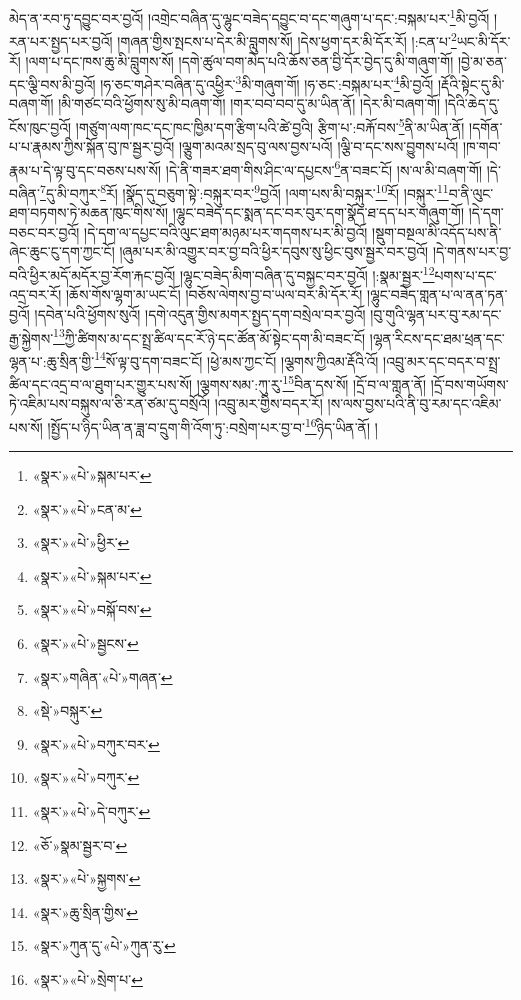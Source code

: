 མེད་ན་རབ་ཏུ་དབྱུང་བར་བྱའོ། །འགྲེང་བཞིན་དུ་ལྷུང་བཟེད་དབྱུང་བ་དང་གཞུག་པ་དང་:བསྐམ་པར་\footnote{«སྣར་»«པེ་»སྐམ་པར་}མི་བྱའོ། །རན་པར་སྤྱད་པར་བྱའོ། །གཞན་གྱིས་སྤངས་པ་དེར་མི་བླུགས་སོ། །དེས་ཕྱག་དར་མི་དོར་རོ། །:ངན་པ་\footnote{«སྣར་»«པེ་»ངན་མ་}ཡང་མི་དོར་རོ། །ལག་པ་དང་ཁས་ཆུ་མི་བླུགས་སོ། །དགེ་ཚུལ་བག་མེད་པའི་ཆོས་ཅན་བྱི་དོར་བྱེད་དུ་མི་གཞུག་གོ། །བྱེ་མ་ཅན་དང་ལྕི་བས་མི་བྱའོ། །ཧ་ཅང་གཤེར་བཞིན་དུ་འཕྱིར་\footnote{«སྣར་»«པེ་»ཕྱིར་}མི་གཞུག་གོ། །ཧ་ཅང་:བསྐམ་པར་\footnote{«སྣར་»«པེ་»སྐམ་པར་}མི་བྱའོ། །རྡོའི་སྟེང་དུ་མི་བཞག་གོ། །མི་གཙང་བའི་ཕྱོགས་སུ་མི་བཞག་གོ། །གར་བབ་བབ་དུ་མ་ཡིན་ནོ། །དེར་མི་བཞག་གོ། །དེའི་ཆེད་དུ་ངོས་ཁུང་བྱའོ། །གཙུག་ལག་ཁང་དང་ཁང་ཁྱིམ་དག་རྩིག་པའི་ཚེ་བྱའི། རྩིག་པ་:བརྐོ་བས་\footnote{«སྣར་»«པེ་»བསྐོ་བས་}ནི་མ་ཡིན་ནོ། །དགོན་པ་པ་རྣམས་ཀྱིས་སྐོན་བུ་ཁ་སྦྱར་བྱའོ། །ལྕུག་མའམ་སྲད་བུ་ལས་བྱས་པའོ། །ལྕི་བ་དང་སས་བྱུགས་པའོ། །ཁ་གབ་རྣམ་པ་དེ་ལྟ་བུ་དང་བཅས་པས་སོ། །དེ་ནི་གཟར་ཐག་གིས་ཤིང་ལ་དཔྱངས་\footnote{«སྣར་»«པེ་»སྦྱངས་}ན་བཟང་ངོ། །ས་ལ་མི་བཞག་གོ། །དེ་བཞིན་\footnote{«སྣར་»གཞིན་«པེ་»གཞན་}དུ་མི་བཀུར་\footnote{«སྡེ་»བསྐུར་}རོ། །སྣོད་དུ་བཅུག་སྟེ་:བསྐུར་བར་\footnote{«སྣར་»«པེ་»བཀུར་བར་}བྱའོ། །ལག་པས་མི་བསྐུར་\footnote{«སྣར་»«པེ་»བཀུར་}རོ། །བསྐུར་\footnote{«སྣར་»«པེ་»དེ་བཀུར་}བ་ནི་ལུང་ཐག་བཏགས་ཏེ་མཆན་ཁུང་གིས་སོ། །ལྷུང་བཟེད་དང་སྨན་དང་བར་བུར་དག་སྣོད་ཐ་དད་པར་གཞུག་གོ། །དེ་དག་བཅང་བར་བྱའོ། །དེ་དག་ལ་དཔྱང་བའི་ལུང་ཐག་མཉམ་པར་གདགས་པར་མི་བྱའོ། །སྡུག་བསྔལ་མི་འདོད་པས་ནི་ཞེང་ཆུང་ངུ་དག་ཀྱང་ངོ། །ཞུམ་པར་མི་འགྱུར་བར་བྱ་བའི་ཕྱིར་དབུས་སུ་ཕྱིང་བུས་སྦྱར་བར་བྱའོ། །དེ་གནས་པར་བྱ་བའི་ཕྱིར་མདོ་མདོར་བྱ་རོག་རྐང་བྱའོ། །ལྷུང་བཟེད་མིག་བཞིན་དུ་བསྐྱང་བར་བྱའོ། །:སྣམ་སྦྱར་\footnote{«ཅོ་»སྣམ་སྦྱར་བ་}པགས་པ་དང་འདྲ་བར་རོ། །ཆོས་གོས་ལྷག་མ་ཡང་ངོ། །བཅོས་ལེགས་བྱ་བ་ཡལ་བར་མི་དོར་རོ། །ལྷུང་བཟེད་གླན་པ་ལ་ནན་ཏན་བྱའོ། །དབེན་པའི་ཕྱོགས་སུའོ། །དགེ་འདུན་གྱིས་མགར་སྤྱད་དག་བསྲེལ་བར་བྱའོ། །བུ་གུའི་ལྷན་པར་བུ་རམ་དང་རྒྱ་སྐྱེགས་\footnote{«སྣར་»«པེ་»སྐྱགས་}ཀྱི་ཚིགས་མ་དང་སྤྲ་ཚིལ་དང་རོ་ཉེ་དང་ཚོན་མོ་སྟེང་དག་མི་བཟང་ངོ། །ལྷན་རིངས་དང་ཐམ་ཕྲན་དང་ལྷན་པ་:ཆུ་སྲིན་གྱི་\footnote{«སྣར་»ཆུ་སྲིན་གྱིས་}སོ་ལྟ་བུ་དག་བཟང་ངོ། །ཕྱེ་མས་ཀྱང་ངོ། །ལྕགས་ཀྱིའམ་རྡོའི་འོ། །འབྲུ་མར་དང་བདར་བ་སྤྲ་ཚིལ་དང་འདྲ་བ་ལ་ཐུག་པར་གྱུར་པས་སོ། །ལྕགས་སམ་:ཀུ་རུ་\footnote{«སྣར་»ཀུན་དུ་«པེ་»ཀུན་རུ་}བིན་དས་སོ། །དྲོ་བ་ལ་གླན་ནོ། །དྲོ་བས་གཡོགས་ཏེ་འཇིམ་པས་བསྐུས་ལ་ཅི་རན་ཙམ་དུ་བསྲོའོ། །འབྲུ་མར་གྱིས་བདར་རོ། །ས་ལས་བྱས་པའི་ནི་བུ་རམ་དང་འཇིམ་པས་སོ། །སྤྱོད་པ་ཉིད་ཡིན་ན་ཟླ་བ་དྲུག་གི་འོག་ཏུ་:བསྲེག་པར་བྱ་བ་\footnote{«སྣར་»«པེ་»སྲེག་པ་}ཉིད་ཡིན་ནོ། །
